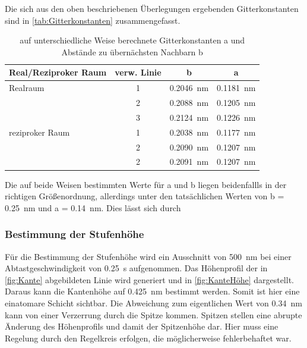\documentclass[a4paper,twoside,final]{article}
\begin{document}
Die sich aus den oben beschriebenen Überlegungen ergebenden Gitterkonstanten sind in \ref{tab:Gitterkonstanten} zusammengefasst.

\begin{table}[h]
	\centering
	\caption{auf unterschiedliche Weise berechnete Gitterkonstanten a und Abstände zu übernächsten Nachbarn b}
	\label{tab:Gitterkonstante}
  \begin{tabular}{l c c c}
   \toprule
   Real/Reziproker Raum & verw. Linie & b  & a  \\
   \midrule
   Realraum    & 1  & \SI{0,2046}{\nano\meter}  & \SI{0,1181}{\nano\meter}\\
     & 2 & \SI{0,2088}{\nano\meter}         & \SI{0,1205}{\nano\meter}\\
   & 3 & \SI{0,2124}{\nano\meter}         & \SI{0,1226}{\nano\meter}\\
  reziproker Raum  & 1 & \SI{0,2038}{\nano\meter}         & \SI{0,1177}{\nano\meter}\\
   & 2 & \SI{0,2090}{\nano\meter}         & \SI{0,1207}{\nano\meter}\\
    & 2 & \SI{0,2091}{\nano\meter}         & \SI{0,1207}{\nano\meter}\\
   \bottomrule
  \end{tabular}
\end{table}

Die auf beide Weisen bestimmten Werte für a und b liegen beidenfallls in der richtigen Größenordnung, allerdings unter den tatsächlichen Werten von b = \SI{0,25}{\nano\meter} und a = \SI{0,14}{\nano\meter}. Dies lässt sich durch


\subsubsection{Bestimmung der Stufenhöhe}
Für die Bestimmung der Stufenhöhe wird ein Ausschnitt von \SI{500}{\nano\meter} bei einer Abtastgeschwindigkeit von \SI{0,25}{\second} aufgenommen. Das Höhenprofil der in \ref{fig:Kante} abgebildeten Linie wird generiert und in \ref{fig:KanteHöhe} dargestellt. Daraus kann die Kantenhöhe auf \SI{0,425}{\nano\meter} bestimmt werden. Somit ist hier eine einatomare Schicht sichtbar. Die Abweichung zum eigentlichen Wert von \SI{0,34}{\nano\meter} kann von einer Verzerrung durch die Spitze kommen. Spitzen stellen eine abrupte Änderung des Höhenprofils und damit der Spitzenhöhe dar. Hier muss eine Regelung durch den Regelkreis erfolgen, die möglicherweise fehlerbehaftet war.
\end{document}
